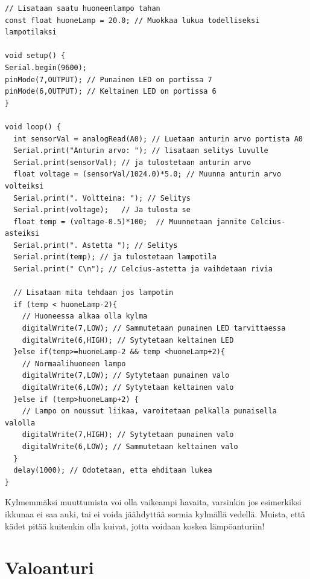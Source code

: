 \begin{tcolorbox}[colback=yellow!10, title={Koodaa!},colbacktitle=orange,breakable]
\begin{solution}
\begin{lstlisting}
// Lisataan saatu huoneenlampo tahan
const float huoneLamp = 20.0; // Muokkaa lukua todelliseksi lampotilaksi

void setup() {
Serial.begin(9600);
pinMode(7,OUTPUT); // Punainen LED on portissa 7
pinMode(6,OUTPUT); // Keltainen LED on portissa 6
}

void loop() {
  int sensorVal = analogRead(A0); // Luetaan anturin arvo portista A0
  Serial.print("Anturin arvo: "); // lisataan selitys luvulle
  Serial.print(sensorVal); // ja tulostetaan anturin arvo
  float voltage = (sensorVal/1024.0)*5.0; // Muunna anturin arvo volteiksi
  Serial.print(". Voltteina: "); // Selitys
  Serial.print(voltage);   // Ja tulosta se
  float temp = (voltage-0.5)*100;  // Muunnetaan jannite Celcius-asteiksi
  Serial.print(". Astetta "); // Selitys
  Serial.print(temp); // ja tulostetaan lampotila
  Serial.print(" C\n"); // Celcius-astetta ja vaihdetaan rivia

  // Lisataan mita tehdaan jos lampotin
  if (temp < huoneLamp-2){
    // Huoneessa alkaa olla kylma
    digitalWrite(7,LOW); // Sammutetaan punainen LED tarvittaessa
    digitalWrite(6,HIGH); // Sytytetaan keltainen LED
  }else if(temp>=huoneLamp-2 && temp <huoneLamp+2){
    // Normaalihuoneen lampo
    digitalWrite(7,LOW); // Sytytetaan punainen valo
    digitalWrite(6,LOW); // Sytytetaan keltainen valo
  }else if (temp>huoneLamp+2) {
    // Lampo on noussut liikaa, varoitetaan pelkalla punaisella valolla
    digitalWrite(7,HIGH); // Sytytetaan punainen valo
    digitalWrite(6,LOW); // Sammutetaan keltainen valo
  }
  delay(1000); // Odotetaan, etta ehditaan lukea
}
\end{lstlisting}
Kylmemmäksi muuttumista voi olla vaikeampi havaita, varsinkin jos esimerkiksi ikkunaa ei saa auki, tai ei voida jäähdyttää sormia kylmällä vedellä. Muista, että kädet pitää kuitenkin olla kuivat, jotta voidaan koskea lämpöanturiin!
\end{solution}
\end{tcolorbox}

\clearpage
\section{Valoanturi}
